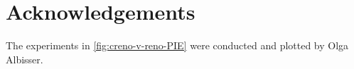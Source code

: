 \section*{Acknowledgements}\label{Acks}
The experiments in \autoref{fig:creno-v-reno-PIE} were conducted and plotted by Olga Albisser.